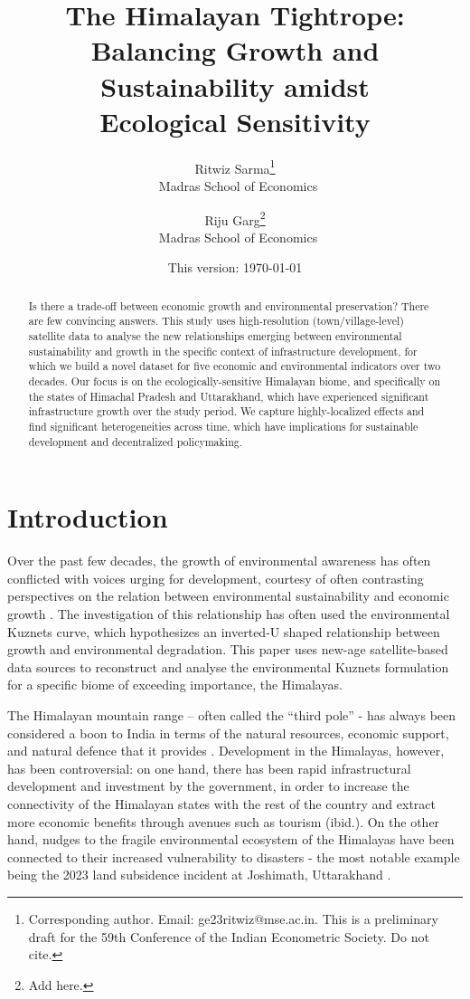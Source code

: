 \documentclass[a4paper,12pt]{article}
\title{\LARGE The Himalayan Tightrope:\\ \Large Balancing Growth and Sustainability amidst\\ Ecological Sensitivity}
\author{Ritwiz Sarma\thanks{Corresponding author. Email: ge23ritwiz@mse.ac.in. This is a preliminary draft for the 59th Conference of the Indian Econometric Society. Do not cite.}\\\small~Madras School of Economics \and Riju Garg\thanks{Add here.}\\\small~Madras School of Economics} %
\date{This version: \today}
\begin{document}
\pagestyle{empty}
\maketitle
\begin{abstract}

    Is there a trade-off between economic growth and environmental preservation? There are few convincing answers. This study uses high-resolution (town/village-level) satellite data to analyse the new relationships emerging between environmental sustainability and growth in the specific context of infrastructure development, for which we build a novel dataset for five economic and environmental indicators over two decades. Our focus is on the ecologically-sensitive Himalayan biome, and specifically on the states of Himachal Pradesh and Uttarakhand, which have experienced significant infrastructure growth over the study period. We capture highly-localized effects and find significant heterogeneities across time, which have implications for sustainable development and decentralized policymaking.

\end{abstract}
\vfill
\newpage
{}
\pagestyle{plain}

\section{Introduction}


Over the past few decades, the growth of environmental awareness has often conflicted with voices urging for development, courtesy of often contrasting perspectives on the relation between environmental sustainability and economic growth \parencite{arrow1995,grossman1991,grossman1995,list1999,selden1994,shafik1992}. The investigation of this relationship has often used the environmental Kuznets curve, which hypothesizes an inverted-U shaped relationship between growth and environmental degradation. This paper uses new-age satellite-based data sources to reconstruct and analyse the environmental Kuznets formulation for a specific biome of exceeding importance, the Himalayas.

The Himalayan mountain range – often called the “third pole” - has always been considered a boon to India in terms of the natural resources, economic support, and natural defence that it provides \parencite{dyola2024}. Development in the Himalayas, however, has been controversial: on one hand, there has been rapid infrastructural development and investment by the government, in order to increase the connectivity of the Himalayan states with the rest of the country and extract more economic benefits through avenues such as tourism (ibid.). On the other hand, nudges to the fragile environmental ecosystem of the Himalayas have been connected to their increased vulnerability to disasters - the most notable example being the 2023 land subsidence incident at Joshimath, Uttarakhand \parencite{sharma2023}.
\end{document}
